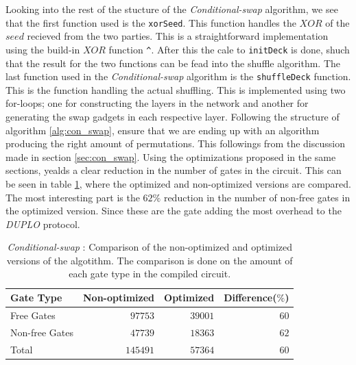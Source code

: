\documentclass[twoside,11pt,openright]{report}
\newcommand{\CS}{\textit{Conditional-swap} }
\newcommand{\DUPLO}{\textit{DUPLO} }
\begin{document}
Looking into the rest of the stucture of the \CS algorithm, we see that the first function used is the \verb|xorSeed|. This function handles the $XOR$ of the $seed$ recieved from the two parties. This is a straightforward implementation using the build-in $XOR$ function \verb|^|. After this the cale to \verb|initDeck| is done, shuch that the result for the two functions can be fead into the shuffle algorithm. The last function used in the \CS algorithm is the \verb|shuffleDeck| function. This is the function handling the actual shuffling. This is implemented using two for-loops; one for constructing the layers in the network and another for generating the swap gadgets in each respective layer. Following the structure of algorithm \ref{alg:con_swap}, ensure that we are ending up with an algorithm producing the right amount of permutations. This followings from the discussion made in section \ref{sec:con_swap}. Using the optimizations proposed in the same sections, yealds a clear reduction in the number of gates in the circuit. This can be seen in table \ref{table:con_swap_comp}, where the optimized and non-optimized versions are compared. The most interesting part is the $62\%$ reduction in the number of non-free gates in the optimized version. Since these are the gate adding the most overhead to the \DUPLO protocol.

\begin{table}[t]
\centering
\begin{tabular}{l || r r r}
Gate Type      & Non-optimized  & Optimized & Difference($\%$)    \\
\hline
Free Gates     &  $97753$       & $39001$   & $60$ \\
Non-free Gates &  $47739$       & $18363$   & $62$ \\
\hline
Total          & $145491$       & $57364$   & $60$
\end{tabular}
\caption{\CS: Comparison of the non-optimized and optimized versions of the algotithm. The comparison is done on the amount of each gate type in the compiled circuit.}
\label{table:con_swap_comp}
\end{table}
\end{document}
